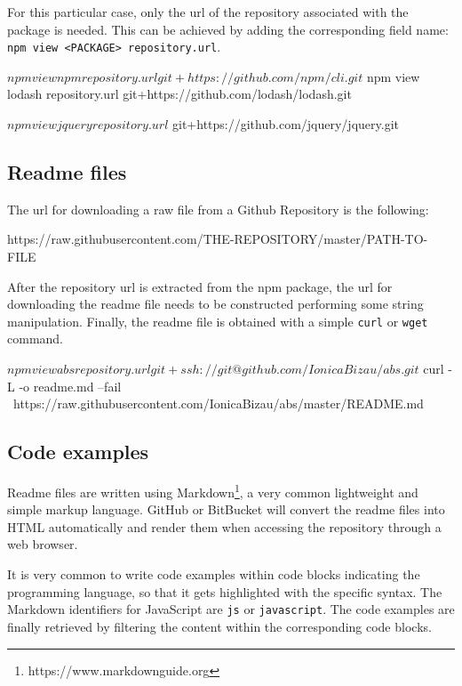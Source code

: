 For this particular case, only the url of the repository associated with the package is needed. This can be achieved by adding the corresponding field name: \texttt{npm view <PACKAGE> repository.url}.

\begin{bashinline}
$ npm view npm repository.url
git+https://github.com/npm/cli.git

$ npm view lodash repository.url
git+https://github.com/lodash/lodash.git

$ npm view jquery repository.url$
git+https://github.com/jquery/jquery.git
\end{bashinline}

\subsection{Readme files}
The url for downloading a raw file from a Github Repository is the following:

\begin{bashinline}
https://raw.githubusercontent.com/THE-REPOSITORY/master/PATH-TO-FILE
\end{bashinline}

After the repository url is extracted from the npm package, the url for downloading the readme file needs to be constructed performing some string manipulation. Finally, the readme file is obtained with a simple \texttt{curl} or \texttt{wget} command.

\begin{bashinline}
$ npm view abs repository.url
git+ssh://git@github.com/IonicaBizau/abs.git

$ curl -L -o readme.md --fail \
    https://raw.githubusercontent.com/IonicaBizau/abs/master/README.md
\end{bashinline}

\subsection{Code examples}
Readme files are written using Markdown\footnote{https://www.markdownguide.org}, a very common lightweight and simple markup language. GitHub or BitBucket will convert the readme files into HTML automatically and render them when accessing the repository through a web browser.

It is very common to write code examples within code blocks indicating the programming language, so that it gets highlighted with the specific syntax. The Markdown identifiers for JavaScript are \texttt{js} or \texttt{javascript}. The code examples are finally retrieved by filtering the content within the corresponding code blocks.


